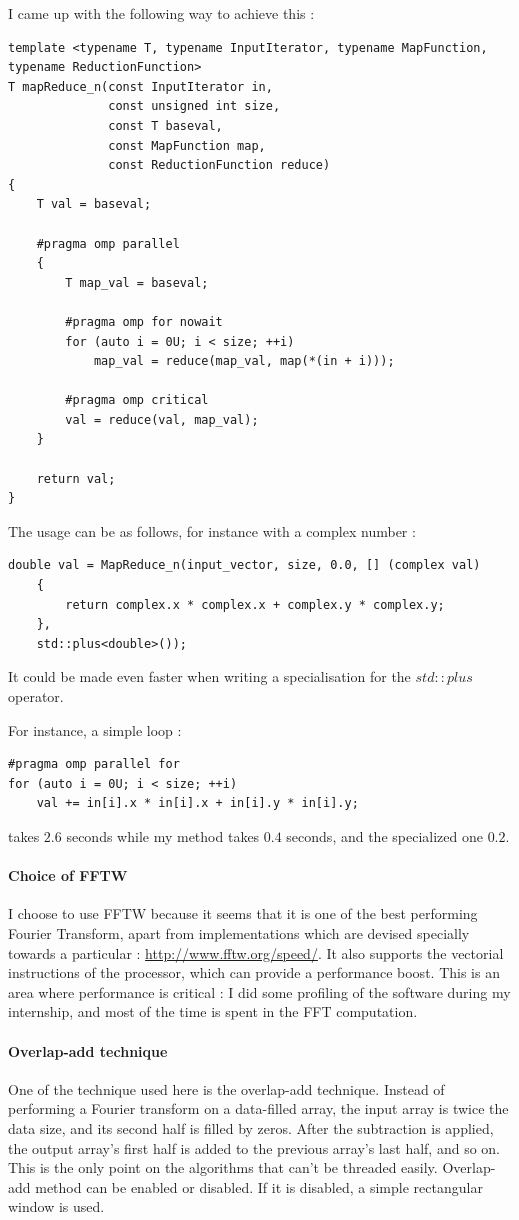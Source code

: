 I came up with the following way to achieve this : 
\begin{lstlisting}[caption=math\_util.cpp]
template <typename T, typename InputIterator, typename MapFunction, typename ReductionFunction>
T mapReduce_n(const InputIterator in,
			  const unsigned int size,
			  const T baseval,
			  const MapFunction map,
			  const ReductionFunction reduce)
{
	T val = baseval;

	#pragma omp parallel
	{
		T map_val = baseval;

		#pragma omp for nowait
		for (auto i = 0U; i < size; ++i)
			map_val = reduce(map_val, map(*(in + i)));

		#pragma omp critical
		val = reduce(val, map_val);
	}

	return val;
}
\end{lstlisting}

The usage can be as follows, for instance with a complex number : 
\begin{lstlisting}
double val = MapReduce_n(input_vector, size, 0.0, [] (complex val)
    {
        return complex.x * complex.x + complex.y * complex.y;
    }, 
    std::plus<double>());
\end{lstlisting}

It could be made even faster when writing a specialisation for the $std::plus$ operator.

For instance, a simple loop :
\begin{lstlisting}
#pragma omp parallel for
for (auto i = 0U; i < size; ++i)
    val += in[i].x * in[i].x + in[i].y * in[i].y;
\end{lstlisting} 
takes $2.6$ seconds while my method takes $0.4$ seconds, and the specialized one $0.2$.

\paragraph{Choice of \ac{FFTW}} I choose to use \ac{FFTW} because it seems that it is one of the best performing Fourier Transform, apart from implementations which are devised specially towards a particular : \url{http://www.fftw.org/speed/}.
It also supports the  vectorial instructions of the  processor, which can provide a performance boost.
This is an area where performance is critical : I did some profiling of the software during my internship, and most of the time is spent in the \ac{FFT} computation.
\paragraph{Overlap-add technique}
One of the technique used here is the overlap-add technique. Instead of performing a Fourier transform on a data-filled array, the input array is twice the data size, and its second half is filled by zeros.
After the subtraction is applied, the output array's first half is added to the previous array's last half, and so on. This is the only point on the algorithms that can't be threaded easily.
Overlap-add method can be enabled or disabled. If it is disabled, a simple rectangular window is used.

